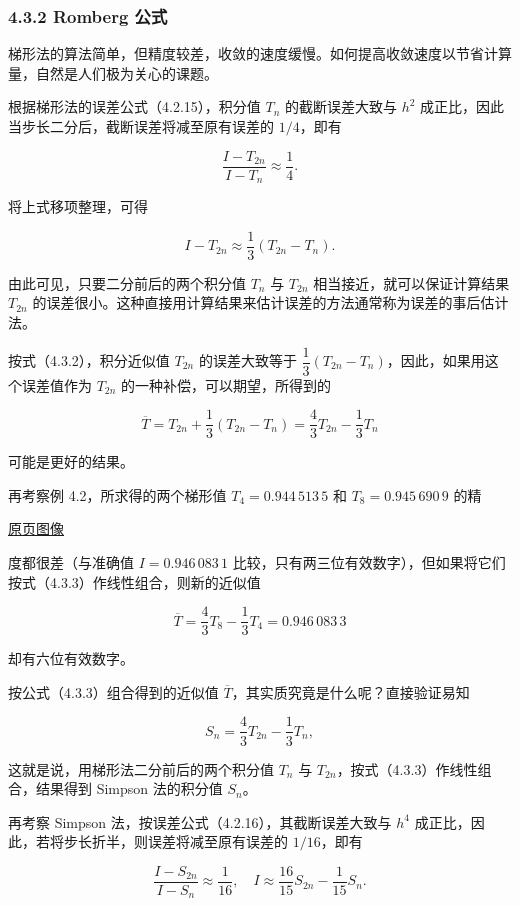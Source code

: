 \documentclass[
  10pt,
  fontset=fandol]{ctexart}
\begin{document}
\subsubsection{4.3.2 Romberg 公式}\label{romberg-ux516cux5f0f}

梯形法的算法简单，但精度较差，收敛的速度缓慢。如何提高收敛速度以节省计算量，自然是人们极为关心的课题。

根据梯形法的误差公式（4.2.15），积分值 \(T_n\) 的截断误差大致与 \(h^2\) 成正比，因此当步长二分后，截断误差将减至原有误差的 \(1/4\)，即有

\[
\frac{I-T_{2n}}{I-T_n}\approx\frac14.
\]

将上式移项整理，可得

\[
I-T_{2n}\approx\frac13(T_{2n}-T_n).
\tag{4.3.2}
\]

由此可见，只要二分前后的两个积分值 \(T_n\) 与 \(T_{2n}\) 相当接近，就可以保证计算结果 \(T_{2n}\) 的误差很小。这种直接用计算结果来估计误差的方法通常称为误差的事后估计法。

按式（4.3.2），积分近似值 \(T_{2n}\) 的误差大致等于 \(\dfrac13(T_{2n}-T_n)\)，因此，如果用这个误差值作为 \(T_{2n}\) 的一种补偿，可以期望，所得到的

\[
\overline T=T_{2n}+\frac13(T_{2n}-T_n)=\frac43T_{2n}-\frac13T_n
\tag{4.3.3}
\]

可能是更好的结果。

再考察例 4.2，所求得的两个梯形值 \(T_4=0.944\,513\,5\) 和 \(T_8=0.945\,690\,9\) 的精

\href{../../source-images/pdf-103.jpeg}{原页图像}

度都很差（与准确值 \(I=0.946\,083\,1\) 比较，只有两三位有效数字），但如果将它们按式（4.3.3）作线性组合，则新的近似值

\[
\overline T=\frac43T_8-\frac13T_4=0.946\,083\,3
\]

却有六位有效数字。

按公式（4.3.3）组合得到的近似值 \(\overline T\)，其实质究竟是什么呢？直接验证易知

\[
S_n=\frac43T_{2n}-\frac13T_n,
\tag{4.3.4}
\]

这就是说，用梯形法二分前后的两个积分值 \(T_n\) 与 \(T_{2n}\)，按式（4.3.3）作线性组合，结果得到 Simpson 法的积分值 \(S_n\)。

再考察 Simpson 法，按误差公式（4.2.16），其截断误差大致与 \(h^4\) 成正比，因此，若将步长折半，则误差将减至原有误差的 \(1/16\)，即有

\[
\frac{I-S_{2n}}{I-S_n}\approx\frac1{16},\quad I\approx\frac{16}{15}S_{2n}-\frac1{15}S_n.
\]
\end{document}
